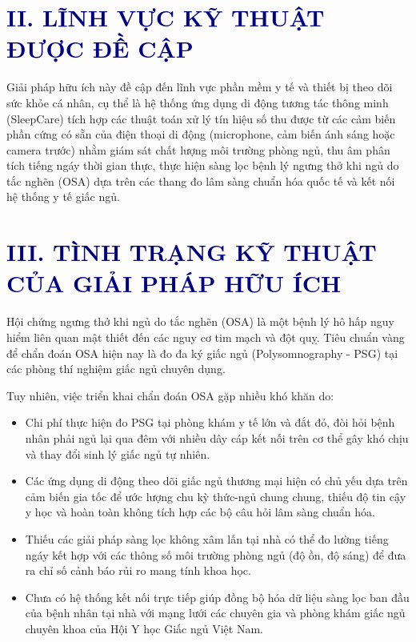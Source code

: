 \documentclass[12pt,a4paper]{article}
\begin{document}
\section{\textcolor{navy}{II. LĨNH VỰC KỸ THUẬT ĐƯỢC ĐỀ CẬP}}
Giải pháp hữu ích này đề cập đến lĩnh vực phần mềm y tế và thiết bị theo dõi sức khỏe cá nhân, cụ thể là hệ thống ứng dụng di động tương tác thông minh (SleepCare) tích hợp các thuật toán xử lý tín hiệu số thu được từ các cảm biến phần cứng có sẵn của điện thoại di động (microphone, cảm biến ánh sáng hoặc camera trước) nhằm giám sát chất lượng môi trường phòng ngủ, thu âm phân tích tiếng ngáy thời gian thực, thực hiện sàng lọc bệnh lý ngưng thở khi ngủ do tắc nghẽn (OSA) dựa trên các thang đo lâm sàng chuẩn hóa quốc tế và kết nối hệ thống y tế giấc ngủ.

\section{\textcolor{navy}{III. TÌNH TRẠNG KỸ THUẬT CỦA GIẢI PHÁP HỮU ÍCH}}
Hội chứng ngưng thở khi ngủ do tắc nghẽn (OSA) là một bệnh lý hô hấp nguy hiểm liên quan mật thiết đến các nguy cơ tim mạch và đột quỵ. Tiêu chuẩn vàng để chẩn đoán OSA hiện nay là đo đa ký giấc ngủ (Polysomnography - PSG) tại các phòng thí nghiệm giấc ngủ chuyên dụng.

Tuy nhiên, việc triển khai chẩn đoán OSA gặp nhiều khó khăn do:
\begin{itemize}
    \item Chi phí thực hiện đo PSG tại phòng khám y tế lớn và đắt đỏ, đòi hỏi bệnh nhân phải ngủ lại qua đêm với nhiều dây cáp kết nối trên cơ thể gây khó chịu và thay đổi sinh lý giấc ngủ tự nhiên.
    \item Các ứng dụng di động theo dõi giấc ngủ thương mại hiện có chủ yếu dựa trên cảm biến gia tốc để ước lượng chu kỳ thức-ngủ chung chung, thiếu độ tin cậy y học và hoàn toàn không tích hợp các bộ câu hỏi lâm sàng chuẩn hóa.
    \item Thiếu các giải pháp sàng lọc không xâm lấn tại nhà có thể đo lường tiếng ngáy kết hợp với các thông số môi trường phòng ngủ (độ ồn, độ sáng) để đưa ra chỉ số cảnh báo rủi ro mang tính khoa học.
    \item Chưa có hệ thống kết nối trực tiếp giúp đồng bộ hóa dữ liệu sàng lọc ban đầu của bệnh nhân tại nhà với mạng lưới các chuyên gia và phòng khám giấc ngủ chuyên khoa của Hội Y học Giấc ngủ Việt Nam.
\end{itemize}
\end{document}
